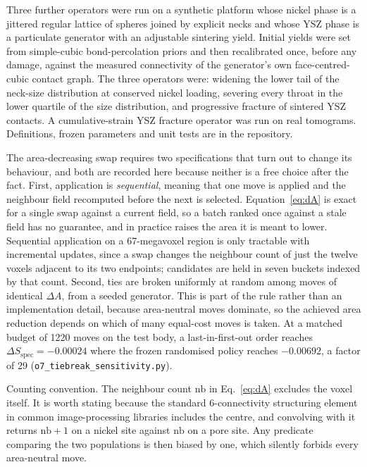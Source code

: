 \documentclass[5p,times,twocolumn]{elsarticle}
\newcommand{\Sspec}{S_{\mathrm{spec}}}
\newcommand{\nb}{\mathrm{nb}}
\begin{document}
Three further operators were run on a synthetic platform whose nickel
phase is a jittered regular lattice of spheres joined by explicit necks and
whose YSZ phase is a particulate generator with an adjustable sintering yield.
Initial yields were set from simple-cubic bond-percolation priors
\cite{lorenz1998} and then recalibrated once, before any damage, against the
measured connectivity of the generator's own face-centred-cubic contact graph.
The three operators were: widening the
lower tail of the neck-size distribution at conserved nickel loading,
severing every throat in the lower quartile of the size distribution, and
progressive fracture of sintered YSZ contacts. A cumulative-strain YSZ
fracture operator was run on real tomograms. Definitions, frozen parameters
and unit tests are in the repository.

The area-decreasing swap requires two specifications that turn out to change
its behaviour, and both are recorded here because neither is a free choice
after the fact. First, application is \emph{sequential}, meaning that one move is applied and
the neighbour field recomputed before the next is selected. Equation~\eqref{eq:dA} is exact for a single swap
against a current field, so a batch ranked once against a stale field has no
guarantee, and in practice raises the area it is meant to lower. Sequential
application on a 67-megavoxel region is only tractable with
incremental updates, since a swap changes the neighbour count of just the
twelve voxels adjacent to its two endpoints; candidates are held in seven
buckets indexed by that count. Second, ties are broken uniformly at
random among moves of identical $\Delta A$, from a seeded generator. This is
part of the rule rather than an implementation detail, because area-neutral
moves dominate,
so the achieved area reduction depends on which of many equal-cost moves is
taken. At a matched budget of 1220 moves on the test body, a
last-in-first-out order reaches $\Delta \Sspec = -0.00024$ where the frozen
randomised policy reaches $-0.00692$, a factor of 29
(\texttt{o7\_tiebreak\_sensitivity.py}).

Counting convention. The neighbour count $\nb$ in Eq.~\eqref{eq:dA} excludes
the voxel itself. It is worth stating because the standard 6-connectivity structuring element in
common image-processing libraries includes the centre,
and convolving with it returns $\nb+1$ on a nickel site against $\nb$ on a pore
site. Any predicate comparing the two populations is then biased by one, which
silently forbids every area-neutral move.
\end{document}
